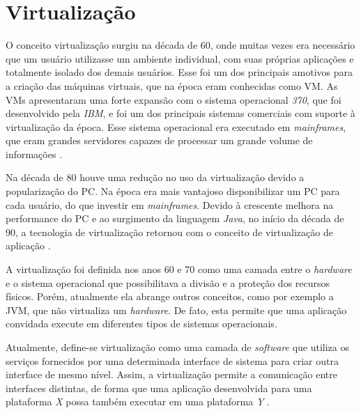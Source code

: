 \chapter{Virtualização}
\label{cap:virtualizacao}

O conceito virtualização surgiu na década de 60, onde muitas vezes era necessário que um usuário utilizasse um ambiente individual, 
com suas próprias aplicações e totalmente isolado dos demais usuários. Esse foi um dos principais amotivos para a criação das máquinas 
virtuais, que na época eram conhecidas como \ac{VM}. As \ac{VM}s apresentaram uma forte expansão com o sistema operacional \textit{370}, que foi 
desenvolvido pela \textit{IBM}, e foi um dos principais sistemas comerciais com suporte à virtualização da época. Esse sistema operacional 
era executado em \textit{mainframes}, que eram grandes servidores capazes de processar um grande volume de informações \cite{laureano2008}. 

Na década de 80 houve uma redução no uso da virtualização devido a popularização do \ac{PC}. Na época era mais vantajoso disponibilizar 
um \ac{PC} para cada usuário, do que investir em \textit{mainframes}. Devido à crescente melhora na performance do \ac{PC} e
ao surgimento da linguagem \textit{Java}, no início da década de 90, a tecnologia de virtualização retornou com o conceito de virtualização
de aplicação \cite{laureano2008}.

A virtualização foi definida nos anos 60 e 70 como uma camada entre o \textit{hardware} e o sistema operacional que possibilitava a 
divisão e a proteção dos recursos físicos. Porém, atualmente ela abrange outros conceitos, como por exemplo a \ac{JVM}, que não virtualiza
um \textit{hardware}. De fato, esta permite que uma aplicação convidada execute em diferentes tipos de sistemas operacionais.

Atualmente, define-se virtualização como uma camada de \textit{software} que utiliza os serviços fornecidos por uma determinada interface de 
sistema para criar outra interface de mesmo nível. Assim, a virtualização permite a comunicação entre interfaces distintas, de forma que uma 
aplicação desenvolvida para uma plataforma \textit{X} possa também executar em uma plataforma \textit{Y} \cite{laureano2008}.

